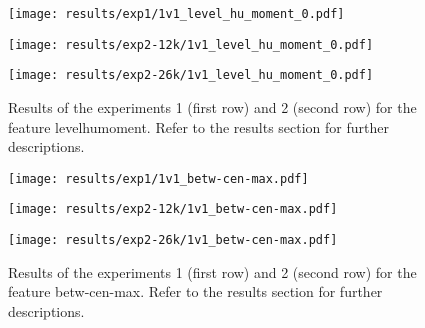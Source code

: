 \begin{figure}[h!]
	\centering
	\begin{minipage}{0.4\linewidth}
		\texttt{[image: results/exp1/1v1\_level\_hu\_moment\_0.pdf]}
	\end{minipage}
	
	\begin{minipage}{0.4\linewidth}
		\texttt{[image: results/exp2-12k/1v1\_level\_hu\_moment\_0.pdf]}
	\end{minipage}
	\begin{minipage}{0.4\linewidth}
		\texttt{[image: results/exp2-26k/1v1\_level\_hu\_moment\_0.pdf]}
	\end{minipage}
	
	\caption[ Results: Feature level\textunderscore hu\textunderscore moment]{ Results of the experiments 1 (first row) and 2 (second row) for the feature level\textunderscore hu\textunderscore moment. Refer to the results section for further descriptions. }
	\label{fig:appendix_level_hu_moment_0}
\end{figure}

\begin{figure}[h!]
	\centering
	\begin{minipage}{0.4\linewidth}
		\texttt{[image: results/exp1/1v1\_betw-cen-max.pdf]}
	\end{minipage}
	
	\begin{minipage}{0.4\linewidth}
		\texttt{[image: results/exp2-12k/1v1\_betw-cen-max.pdf]}
	\end{minipage}
	\begin{minipage}{0.4\linewidth}
		\texttt{[image: results/exp2-26k/1v1\_betw-cen-max.pdf]}
	\end{minipage}
	
	\caption[ Results: Feature betw-cen-max]{ Results of the experiments 1 (first row) and 2 (second row) for the feature betw-cen-max. Refer to the results section for further descriptions. }
	\label{fig:appendix_betw-cen-max}
\end{figure}
\newpage 



